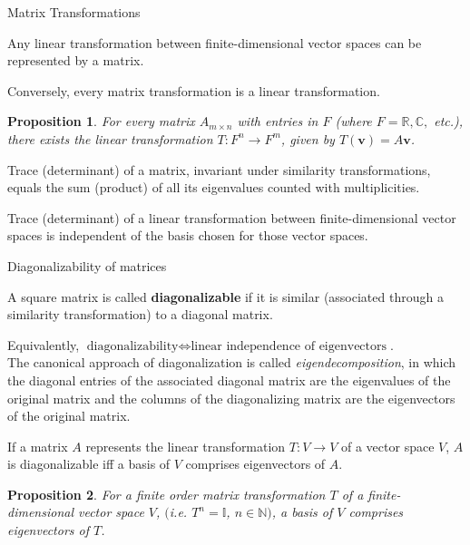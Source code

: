 \documentclass{beamer}
\newcommand\boldtext[1]{\textcolor{bolds}{\textbf{#1}}}
\newcommand\italictext[1]{\textcolor{italics}{\textit{#1}}}
\newtheorem{proposition}{Proposition}
\begin{document}
\begin{frame}{Matrix Transformations}
    \begin{lemma}
        Any linear transformation between finite-dimensional vector spaces can be represented by a matrix.
    \end{lemma}
    Conversely, every matrix transformation is a linear transformation.
    \begin{proposition}
        For every matrix $A_{m\times n}$ with entries in $F$ (where $F=\mathbb{R}, \mathbb{C},$ etc.), there exists the linear transformation $T:F^n\xrightarrow{}F^m$, given by $T(\mathbf{v})=A\mathbf{v}$.
    \end{proposition}
    \begin{lemma}
        Trace (determinant) of a matrix, invariant under similarity transformations, equals the sum (product) of all its eigenvalues counted with multiplicities.
    \end{lemma}
    \begin{corollary}
        Trace (determinant) of a linear transformation between finite-dimensional vector spaces is independent of the basis chosen for those vector spaces.
    \end{corollary}
\end{frame}

\begin{frame}{Diagonalizability of matrices}
    \begin{definition}
        A square matrix is called \boldtext{diagonalizable} if it is similar (associated through a similarity transformation) to a diagonal matrix.
    \end{definition}
    Equivalently, $\text{diagonalizability}\iff\text{linear independence of eigenvectors}$.\\
    The canonical approach of diagonalization is called \italictext{eigendecomposition}, in which the diagonal entries of the associated diagonal matrix are the eigenvalues of the original matrix and the columns of the diagonalizing matrix are the eigenvectors of the original matrix.
    \begin{lemma}
        If a matrix $A$ represents the linear transformation $T:V\xrightarrow{}V$ of a vector space $V$, $A$ is diagonalizable iff a basis of $V$ comprises eigenvectors of $A$.
    \end{lemma}
    \begin{proposition}
        For a finite order matrix transformation $T$ of a finite-dimensional vector space $V$, $($i.e. $T^n=\mathbb{I}$, $n\in\mathbb{N})$, a basis of $V$ comprises eigenvectors of $T$.
    \end{proposition}
\end{frame}
\end{document}

